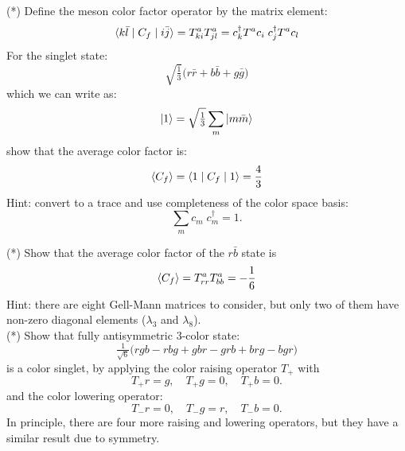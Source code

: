 \documentclass[12pt]{article}
\begin{document}
\exercise (*) Define the meson color factor operator by the matrix element:
$$\braket{ k \bar{l} \mid C_f \mid i \bar{j}} = T_{ki}^a T_{jl}^a
= c_k^\dagger T^a c_i \; c_j^\dagger T^a c_l$$
For the singlet state:
$$\sqrt{\tfrac{1}{3}} \big( r \bar r   + b \bar b + g \bar g \big)$$
which we can write as:
$$\ket{1} = \sqrt{\tfrac{1}{3}} \sum_m \ket{m \bar{m}}$$
show that the average color factor is:
$$\braket{C_f} = \braket{1 \mid C_f \mid 1} = \frac{4}{3}$$
Hint: convert to a trace and use completeness of the color space basis:
$$\sum_m c_m \; c_m^\dagger = 1.$$

\exercise (*) Show that the average color factor of the $r\bar{b}$ state is
$$\braket{C_f} = T^a_{rr} T^a_{bb} = -\frac{1}{6}$$
Hint: there are eight Gell-Mann matrices to consider, but only two of
them have non-zero diagonal elements ($\lambda_3$ and $\lambda_8$).\\[5pt]

\exercise (*) Show that fully antisymmetric 3-color state:
$$\tfrac{1}{\sqrt{6}}
\Big(rgb - rbg + gbr - grb + brg - bgr \Big)$$
is a color singlet, by applying the color raising operator $T_+$ with
$$T_+ r = g,  \quad T_+ g = 0, \quad T_+ b = 0.$$ 
and the color lowering operator:
$$T_- r = 0,  \quad T_- g = r, \quad T_- b = 0.$$ 
In principle, there are four more raising and lowering operators, but
they have a similar result due to symmetry.\\[5pt]
\end{document}
